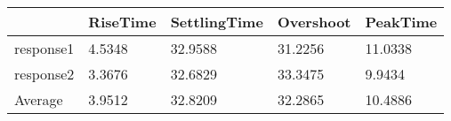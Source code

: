 \begin{tabular}{lllll}
  & RiseTime & SettlingTime & Overshoot & PeakTime \\ 
\hline 
response1 & 4.5348 & 32.9588 & 31.2256 & 11.0338 \\ 
response2 & 3.3676 & 32.6829 & 33.3475 & 9.9434 \\ 
Average & 3.9512 & 32.8209 & 32.2865 & 10.4886 \\ 
\hline 
\end{tabular}